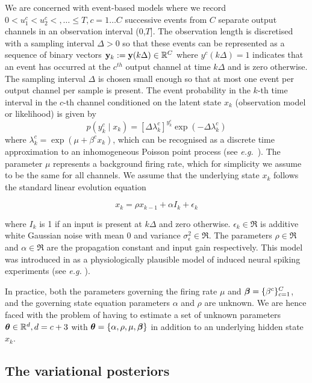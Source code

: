 \documentclass[12pt]{article}
\begin{document}
We are concerned with event-based models where  we record $0 < u_1^c < u_2^c <, \dots  \le T, c = 1
\dots C$ successive events from $C$ separate output channels in an observation interval (0,$T$]. The
observation length is discretised with a sampling interval $\Delta > 0$ so that these events can be
represented as a sequence of binary vectors ${\bf y}_k := {\bf y}(k\Delta) \in \mathbb{R}^C$ where $y^c(k\Delta) = 1$
indicates that an event has occurred at the $c^{th}$ output channel at time $k\Delta$ and is zero
otherwise. The sampling interval $\Delta$ is chosen small enough so that at most one event per
output channel per sample is present.  The event probability in the $k$-th time interval in the
$c$-th channel conditioned on the latent state $x_k$ (observation model or likelihood) is given by
\begin{equation} p(y^c_k \mid x_k) = [\Delta \lambda^c_k]^{y^c_k}\exp(-\Delta
	\lambda^c_k)\label{spikeLike} \end{equation} where $\lambda^c_k = \exp(\mu + \beta^c x_k)$,
	which can be recognised as a discrete time approximation to an inhomogeneous Poisson point
	process (see {\em e.g.}~\cite{Daley_2003}). The parameter $\mu$ represents a background
	firing rate, which for simplicity we assume to be the same for all channels. We assume that
	the underlying state $x_k$ follows the standard linear evolution equation

\begin{equation} x_k = \rho x_{k-1} + \alpha I_k + \epsilon_k \end{equation}

\noindent where $I_k$ is 1 if an input is present at $k\Delta$ and zero otherwise. $\epsilon_k \in
\Re$ is additive white Gaussian noise with mean 0 and variance $\sigma^2_\epsilon \in \Re$. The
parameters $\rho \in \Re$ and $\alpha \in \Re$ are the propagation constant and input gain
respectively.  This model was introduced in \cite{Smith_2003} as a physiologically plausible model
of induced neural spiking experiments (see {\em e.g.} \cite{Ergun_2007}).

In practice, both the parameters governing the firing rate $\mu$ and ${\bm \beta} = \{\beta^c\}_{c=1}^C$,
and the governing state equation parameters $\alpha$ and $\rho$ are unknown. We are hence faced with
the problem of having to estimate a set of unknown parameters ${\bm \theta} \in \mathbb{R}^d, d = c+3$ with
${\bm \theta} = \{\alpha,\rho,\mu,{\bm \beta}\}$ in addition to an underlying hidden state $x_k$.

\subsection{The variational posteriors}
\end{document}
